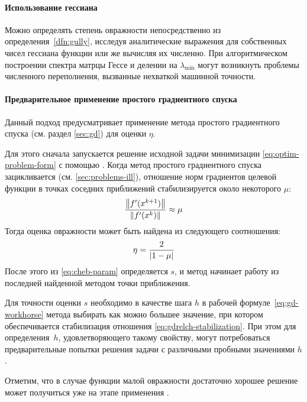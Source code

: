 \paragraph{Использование гессиана}

Можно определять степень овражности непосредственно из
определения \ref{dfn:gully}, исследуя аналитические выражения для
собственных чисел гессиана функции или же вычисляя их численно. При
алгоритмическом построении спектра матрцы Гессе и делении на
$\lambda_{\min}$ могут возникнуть проблемы численного переполнения,
вызванные нехваткой машинной точности.

\paragraph{Предварительное применение простого градиентного спуска}

Данный подход предусматривает применение метода простого градиентного
спуска (см. раздел \ref{sec:gd}) для оценки $\eta$. 

Для этого сначала запускается решение исходной задачи минимизации
\eqref{eq:optim-problem-form} с помощью \gd{}. Когда метод простого
градиентного спуска зацикливается (см. \ref{sec:problems-ill}),
отношение норм градиентов целевой функции в точках соседних
приближений стабилизируется около некоторого $\mu$:
\begin{equation}
  \label{eq:gdrelch-stabilization}
  \frac{\left \lVert{f'(x^{k+1})}\right \rVert}{\left \lVert{f'(x^k)}\right \rVert} \approx \mu
\end{equation}
Тогда оценка овражности может быть найдена из следующего
соотношения:
\begin{equation}
  \label{eq:gdrelch-param}
  \eta = \frac{2}{\left \lvert{1-\mu}\right \rvert}
\end{equation}
После этого из \eqref{eq:cheb-param} определяется $s$, и метод
\relch{} начинает работу из последней найденной методом \gd{} точки
приближения.

Для точности оценки $s$ необходимо в качестве шага $h$ в рабочей
формуле \eqref{eq:gd-workhorse} метода \gd{} выбирать как можно
большее значение, при котором обеспечивается стабилизация отношения
\eqref{eq:gdrelch-stabilization}. При этом для определения $h$,
удовлетворяющего такому свойству, могут потребоваться предварительные
попытки решения задачи с различными пробными значениями $h$.

Отметим, что в случае функции малой овражности достаточно хорошее
решение может получиться уже на этапе применения \gd{}.


